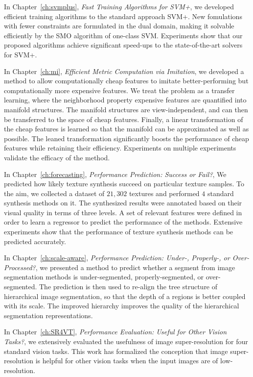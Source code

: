 In Chapter~\ref{ch:svmplus}, \emph{Fast Training Algorithms for SVM+}, we developed  efficient training algorithms to the standard approach SVM+.  New fomulations with fewer constraints are formulated in the dual domain, making it solvable efficiently by the SMO algorithm of one-class SVM.  Experiments show that our proposed algorithms achieve significant speed-ups to  the state-of-the-art solvers for  SVM+.
  
In Chapter~\ref{ch:mi}, \emph{Efficient Metric Computation via Imitation}, we developed a method to allow computationally cheap features to imitate better-performing but computationally more expensive features. We treat the problem as a transfer learning, where the neighborhood property expensive features are quantified into manifold structures. The manifold structures are view-independent, and can then be transferred to the space of cheap features. Finally, a linear transformation of the cheap features is learned so that the manifold can be approximated as well as possible.  The leaned transformation significantly boosts the performance of cheap features while retaining their efficiency.  Experiments on multiple experiments validate the efficacy of the method. 
  
In Chapter~\ref{ch:forecasting}, \emph{Performance Prediction: Success or Fail?}, We predicted how likely texture synthesis succeed on particular texture samples. To the aim, we collected a dataset of $21, 302$ textures and performed $4$ standard synthesis methods on it. The synthesized results were annotated based on their visual quality in terms of three levels. A set of relevant features were defined in order to learn a regressor to predict the performance of the methods. Extensive experiments show that the performance of texture synthesis methods can be predicted accurately.  

In Chapter~\ref{ch:scale-aware}, \emph{Performance Prediction: Under-, Properly-, or Over-Processed?}, we presented a method to predict whether a segment from image segmentation methods is under-segmented, properly-segmented, or over-segmented.  The prediction is then used to re-align the tree structure of hierarchical image segmentation, so that the depth of a regions is better coupled with its scale.  The improved hierarchy improves the quality of the hierarchical segmentation representations.


In Chapter~\ref{ch:SR4VT}, \emph{Performance Evaluation: Useful for Other Vision Tasks?}, we extensively evaluated the usefulness of image super-resolution for four standard vision tasks. This work has formalized the conception that image super-resolution is helpful for other vision tasks when the input images are of low-resolution.  


